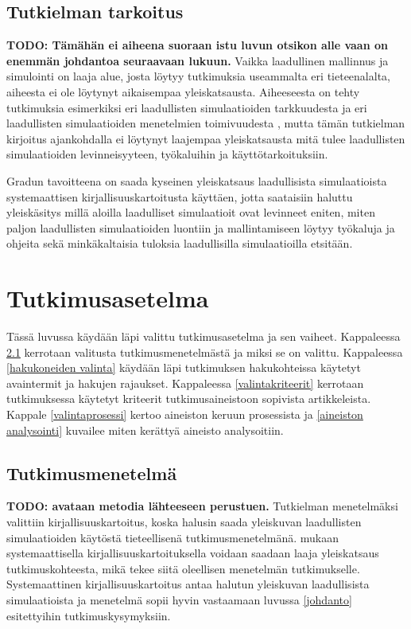 \documentclass[utf8]{gradu3}
\begin{document}
 \section{Tutkielman tarkoitus}
 \textbf{TODO: Tämähän ei aiheena suoraan istu luvun otsikon alle vaan on enemmän johdantoa seuraavaan lukuun.}
Vaikka laadullinen mallinnus ja simulointi on laaja alue, josta löytyy tutkimuksia useammalta eri tieteenalalta, aiheesta ei ole löytynyt aikaisempaa yleiskatsausta. Aiheeseesta on tehty tutkimuksia esimerkiksi eri laadullisten simulaatioiden tarkkuudesta \parencite{FisherManagmentTechniques2024} ja eri laadullisten simulaatioiden menetelmien toimivuudesta \parencite{qualitativeSimTechniquesAssesment1992}, mutta tämän tutkielman kirjoitus ajankohdalla ei löytynyt laajempaa yleiskatsausta mitä tulee laadullisten simulaatioiden levinneisyyteen, työkaluihin ja käyttötarkoituksiin.  

Gradun tavoitteena on saada kyseinen yleiskatsaus laadullisista simulaatioista systemaattisen kirjallisuuskartoitusta käyttäen, jotta saataisiin haluttu yleiskäsitys millä aloilla laadulliset simulaatioit ovat levinneet eniten, miten paljon laadullisten simulaatioiden luontiin ja mallintamiseen löytyy työkaluja ja ohjeita sekä minkäkaltaisia tuloksia laadullisilla simulaatioilla etsitään.


\chapter{Tutkimusasetelma}
Tässä luvussa käydään läpi valittu tutkimusasetelma ja sen vaiheet. Kappaleessa \ref{tutkimusmenetelmä} kerrotaan valitusta tutkimusmenetelmästä ja miksi se on valittu. Kappaleessa \ref{hakukoneiden valinta} käydään läpi tutkimuksen hakukohteissa käytetyt avaintermit ja hakujen rajaukset. Kappaleessa \ref{valintakriteerit} kerrotaan tutkimuksessa käytetyt kriteerit tutkimusaineistoon sopivista artikkeleista. Kappale \ref{valintaprosessi} kertoo aineiston keruun prosessista ja \ref{aineiston analysointi} kuvailee miten kerättyä aineisto analysoitiin.

\section{Tutkimusmenetelmä} \label{tutkimusmenetelmä}
\textbf{TODO: avataan metodia lähteeseen perustuen.}
Tutkielman menetelmäksi valittiin kirjallisuuskartoitus, koska halusin saada yleiskuvan laadullisten simulaatioiden käytöstä tieteellisenä tutkimusmenetelmänä. \textcite{keele2007guidelines} mukaan systemaattisella kirjallisuuskartoituksella voidaan saadaan laaja yleiskatsaus tutkimuskohteesta, mikä tekee siitä oleellisen menetelmän tutkimukselle. Systemaattinen kirjallisuuskartoitus antaa halutun yleiskuvan laadullisista simulaatioista ja menetelmä sopii hyvin vastaamaan luvussa \ref{johdanto} esitettyihin tutkimuskysymyksiin.
\end{document}
